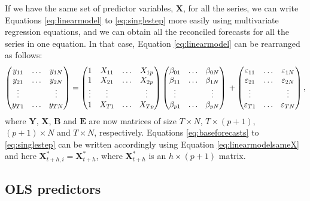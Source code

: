 \documentclass[11pt,a4paper,]{article}
\begin{document}
If we have the same set of predictor variables, \(\bm{X}\), for all the series, we can write Equations \eqref{eq:linearmodel} to \eqref{eq:singlestep} more easily using multivariate regression equations, and we can obtain all the reconciled forecasts for all the series in one equation. In that case, Equation \eqref{eq:linearmodel} can be rearranged as follows:
\begin{equation}\label{eq:linearmodelsameX}
  \begin{pmatrix}
  y_{11} & \dots & y_{1N}\\
  y_{21} & \dots & y_{2N}\\
  \vdots &       & \vdots\\
  y_{T1} & \dots & y_{TN}
  \end{pmatrix} =
  \begin{pmatrix}
  1      & X_{11} & \dots & X_{1p}\\
  1      & X_{21} & \dots & X_{2p}\\
  \vdots & \vdots &       & \vdots\\
  1      & X_{T1} & \dots & X_{Tp}
  \end{pmatrix}
  \begin{pmatrix}
  \beta_{01} & \dots & \beta_{0N}\\
  \beta_{11} & \dots & \beta_{1N}\\
  \vdots     &       & \vdots\\
  \beta_{p1} & \dots & \beta_{pN}
  \end{pmatrix} \\
  +
  \begin{pmatrix}
  \varepsilon_{11} & \dots & \varepsilon_{1N}\\
  \varepsilon_{21} & \dots & \varepsilon_{2N}\\
  \vdots           &       & \vdots\\
  \varepsilon_{T1} & \dots & \varepsilon_{TN}
  \end{pmatrix},
\end{equation}
where \(\bm{Y}\), \(\bm{X}\), \(\bm{B}\) and \(\bm{E}\) are now matrices of size \(T\times N\), \(T\times (p+1)\), \((p+1)\times N\) and \(T \times N\), respectively. Equations \eqref{eq:baseforecasts} to \eqref{eq:singlestep} can be written accordingly using Equation \eqref{eq:linearmodelsameX} and here \(\bm{X}^*_{t+h,i} = \bm{X}^*_{t+h}\), where \(\bm{X}^*_{t+h}\) is an \(h\times (p+1)\) matrix.

\hypertarget{ols-predictors}{%
\subsection{OLS predictors}\label{ols-predictors}}
\end{document}
